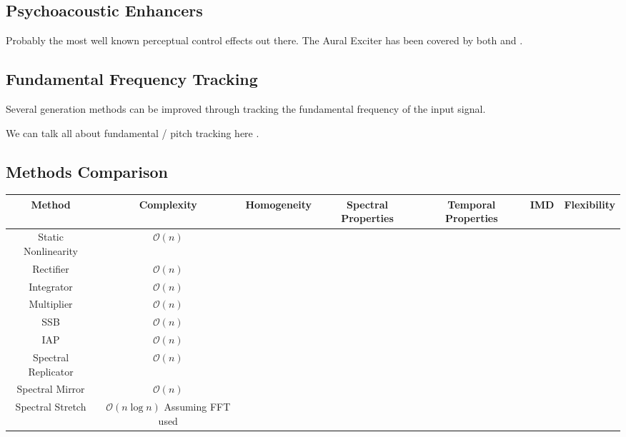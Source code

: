 	\subsection{Psychoacoustic Enhancers}
	\label{sec:Excitation-Enhancers}
		\note
		{
			Probably the most well known perceptual control effects out there. The Aural Exciter has been 
			covered by both \citet{chalupper2000aural} and \citet{shekar2013modeling}.
		}

	\subsection{Fundamental Frequency Tracking}
	\label{sec:Excitation-Fundamental}
		\note
		{
			Several generation methods can be improved through tracking the fundamental frequency of the input 
			signal.

			We can talk all about fundamental / pitch tracking here \citep{cuadra2001efficient, 
			gerhard2003pitch, prukkanon2009vt-amdf, larsen2004audio}.
		}

\begin{landscape}
\section{Methods Comparison}
\label{sec:Excitation-Comparison}

	\begin{tabular}{|c|c|c|c|c|c|c|}
		\hline
		\bf{Method} & \bf{Complexity} & \bf{Homogeneity} & \bf{Spectral Properties} & \bf{Temporal Properties} &
		\bf{IMD} & \bf{Flexibility} \\ %
		\hline
		Static Nonlinearity & $\mathcal{O}(n)$ & & & & & \\
		\hline
		Rectifier & $\mathcal{O}(n)$ & & & & & \\
		\hline
		Integrator & $\mathcal{O}(n)$ & & & & & \\
		\hline
		Multiplier & $\mathcal{O}(n)$ & & & & & \\
		\hline
		SSB & $\mathcal{O}(n)$ & & & & & \\
		\hline
		IAP & $\mathcal{O}(n)$ & & & & & \\
		\hline
		Spectral Replicator & $\mathcal{O}(n)$ & & & & & \\
		\hline
		Spectral Mirror & $\mathcal{O}(n)$ & & & & & \\
		\hline
		Spectral Stretch & $\mathcal{O}(n\log{n})$ Assuming FFT used & & & & & \\
		\hline
	\end{tabular}

\end{landscape}


